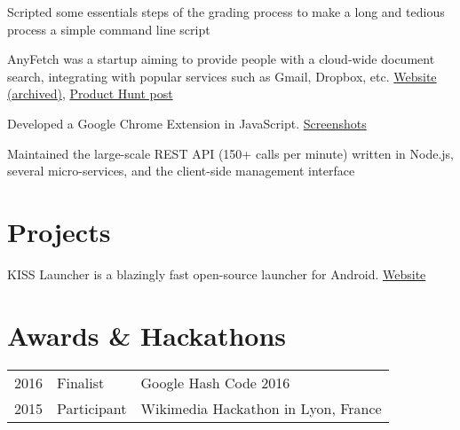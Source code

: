 \documentclass[]{resume-openfont}
\begin{document}
\begin{minipage}[t]{0.66\textwidth}
%
%
\begin{tightemize}
\vspace{\topsep}
\item Scripted some essentials steps of the grading process to make a long and tedious process a simple command line script
\end{tightemize}
\sectionsep

%
%
AnyFetch was a startup aiming to provide people with a cloud-wide document search, integrating with popular services such as Gmail, Dropbox, etc. \href{https://i.imgur.com/B3MMD6Y.png}{Website (archived)}, \href{https://www.producthunt.com/posts/anyfetch}{Product Hunt post}
\vspace{\topsep}
\begin{tightemize}
\item Developed a Google Chrome Extension in JavaScript. \href{https://i.imgur.com/yql5v1z.png}{Screenshots}
\item Maintained the large-scale REST API (150+ calls per minute) written in Node.js, several micro-services, and the client-side management interface
\end{tightemize}


\section{Projects}
%
%
KISS Launcher is a blazingly fast open-source launcher for Android. \href{http://kisslauncher.com/}{Website}
\sectionsep


\section{Awards \& Hackathons}
\begin{tabular}{@{}rll}
2016       & Finalist    & Google Hash Code 2016\\
2015	     & Participant & Wikimedia Hackathon in Lyon, France
\end{tabular}
\sectionsep

\end{minipage}
\end{document}
